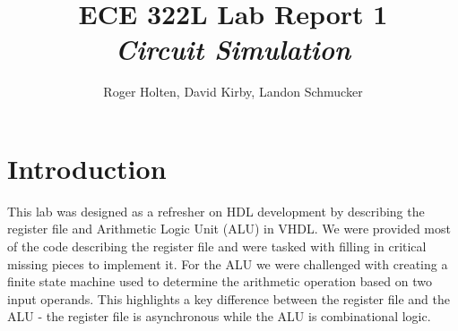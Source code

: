 \documentclass{article}
\begin{document}
    \begin{titlepage}
        \title{ECE 322L Lab Report 1\\
        [0.65cm]
        \it{Circuit Simulation}}
        \author{\LARGE Roger Holten, David Kirby, Landon Schmucker}
        \maketitle
        \thispagestyle{empty}
    \end{titlepage}




\section*{Introduction}
This lab was designed as a refresher on HDL development by describing the register file and Arithmetic Logic Unit (ALU) in VHDL. We were provided most of the code describing the register file and were tasked with filling in critical missing pieces to implement it. For the ALU we were challenged with creating a finite state machine used to determine the arithmetic operation based on two input operands. This highlights a key difference between the register file and the ALU - the register file is asynchronous while the ALU is combinational logic.
\end{document}
